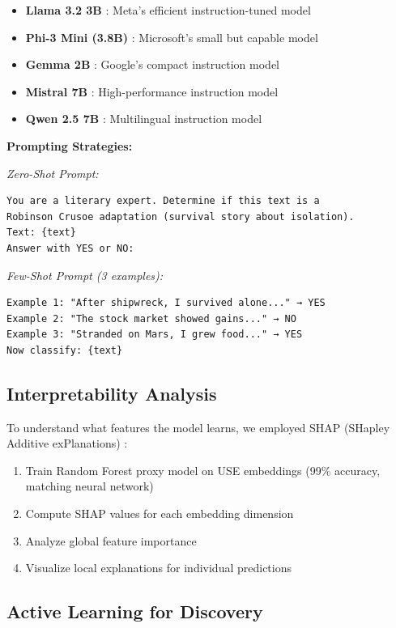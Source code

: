 \documentclass[12pt,a4paper]{article}
\begin{document}
\begin{itemize}
    \item \textbf{Llama 3.2 3B} \cite{MetaAI2024}: Meta's efficient instruction-tuned model
    \item \textbf{Phi-3 Mini (3.8B)} \cite{Microsoft2024}: Microsoft's small but capable model
    \item \textbf{Gemma 2B} \cite{Google2024}: Google's compact instruction model
    \item \textbf{Mistral 7B} \cite{Jiang2023}: High-performance instruction model
    \item \textbf{Qwen 2.5 7B} \cite{Alibaba2024}: Multilingual instruction model
\end{itemize}

\textbf{Prompting Strategies:}

\textit{Zero-Shot Prompt:}
\begin{verbatim}
You are a literary expert. Determine if this text is a
Robinson Crusoe adaptation (survival story about isolation).
Text: {text}
Answer with YES or NO:
\end{verbatim}

\textit{Few-Shot Prompt (3 examples):}
\begin{verbatim}
Example 1: "After shipwreck, I survived alone..." → YES
Example 2: "The stock market showed gains..." → NO
Example 3: "Stranded on Mars, I grew food..." → YES
Now classify: {text}
\end{verbatim}

\subsection{Interpretability Analysis}

To understand what features the model learns, we employed SHAP (SHapley Additive exPlanations) \cite{Lundberg2017}:

\begin{enumerate}
    \item Train Random Forest proxy model on USE embeddings (99\% accuracy, matching neural network)
    \item Compute SHAP values for each embedding dimension
    \item Analyze global feature importance
    \item Visualize local explanations for individual predictions
\end{enumerate}

\subsection{Active Learning for Discovery}
\end{document}
